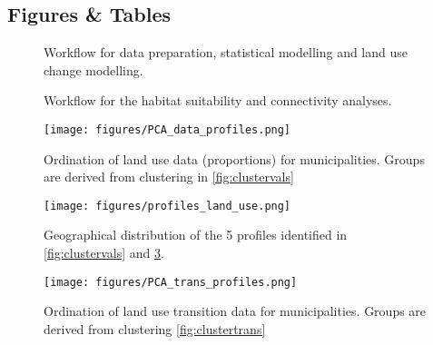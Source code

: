 \newpage
\begin{center}
\section*{Figures \& Tables}
\end{center}


\begin{figure}[h]
\caption{Workflow for data preparation, statistical modelling and land use change modelling.}
\label{fig:workflow1}
\end{figure}
\clearpage

\begin{figure}[h!]
\caption{Workflow for the habitat suitability and connectivity analyses.} 
\label{fig:workflow2}
\end{figure}
\clearpage




\begin{figure}[h!]
  \centering
    \texttt{[image: figures/PCA\_data\_profiles.png]}
  \caption{Ordination of land use data (proportions) for municipalities. Groups are derived from clustering in \ref{fig:clustervals}}
  \label{fig:PCAvals}
\end{figure}

\begin{figure}[h!]
  \centering
    \texttt{[image: figures/profiles\_land\_use.png]}
  \caption{Geographical distribution of the 5 profiles identified in \ref{fig:clustervals} and \ref{fig:PCAvals}.}
  \label{fig:mapvals}
\end{figure}


\begin{figure}[h!]
  \centering
    \texttt{[image: figures/PCA\_trans\_profiles.png]}
  \caption{Ordination of land use transition data for municipalities. Groups are derived from clustering \ref{fig:clustertrans}}
  \label{fig:PCAtrans}
\end{figure}

